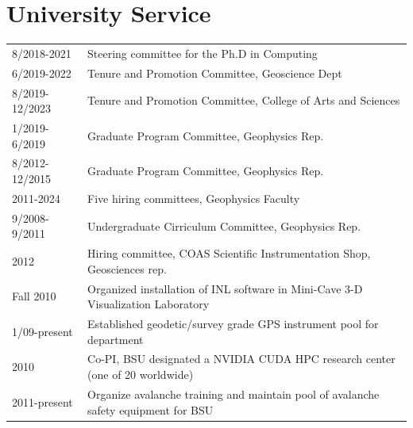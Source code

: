 \documentclass[11pt]{article}
\renewcommand\arraystretch{1}
\begin{document}
\section*{University Service}
\begingroup
\renewcommand\arraystretch{0.7}
\begin{longtable}{p{1.2in}|p{5.7in}}
8/2018-2021 & Steering committee for the Ph.D in Computing \\
6/2019-2022 & Tenure and Promotion Committee, Geoscience Dept \\
8/2019-12/2023 & Tenure and Promotion Committee, College of Arts and Sciences \\
1/2019-6/2019 & Graduate Program Committee, Geophysics Rep. \\
8/2012-12/2015 & Graduate Program Committee, Geophysics Rep. \\
2011-2024 & Five hiring committees, Geophysics Faculty \\ 
9/2008-9/2011 & Undergraduate Cirriculum Committee, Geophysics Rep. \\
2012 & Hiring committee, COAS Scientific Instrumentation Shop, Geosciences rep. \\
Fall 2010 & Organized installation of INL software in Mini-Cave 3-D Visualization Laboratory \\
1/09-present & Established geodetic/survey grade GPS instrument pool for department \\
2010 & Co-PI, BSU designated a NVIDIA CUDA HPC research center (one of 20 worldwide)  \\
2011-present & Organize avalanche training and maintain pool of avalanche safety equipment for BSU \\ 
\end{longtable}
\endgroup
\end{document}

